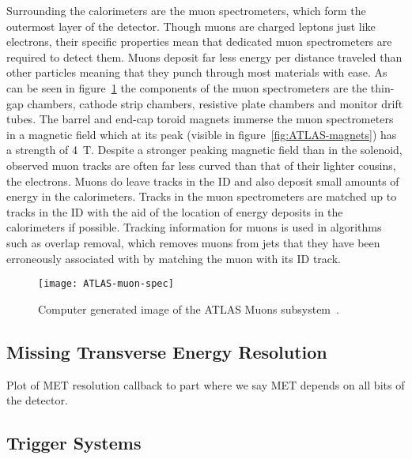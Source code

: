 Surrounding the calorimeters are the muon spectrometers, which form the
outermost layer of the detector. Though muons are charged leptons just like
electrons, their specific properties mean that dedicated muon spectrometers are
required to detect them. Muons deposit far less energy per distance traveled
than other particles meaning that they punch through most materials with ease.
As can be seen in figure~\ref{fig:ATLAS-muon} the components of the muon
spectrometers are the thin-gap chambers, cathode strip chambers, resistive plate
chambers and monitor drift tubes. The barrel and end-cap toroid magnets immerse
the muon spectrometers in a magnetic field which at its peak (visible in
figure~\ref{fig:ATLAS-magnets}) has a strength of 4~T. Despite a stronger
peaking magnetic field than in the solenoid, observed muon tracks are often far
less curved than that of their lighter cousins, the electrons. Muons do leave
tracks in the ID and also deposit small amounts of energy in the calorimeters.
Tracks in the muon spectrometers are matched up to tracks in the ID with the aid
of the location of energy deposits in the calorimeters if possible. Tracking
information for muons is used in algorithms such as overlap removal, which
removes muons from jets that they have been erroneously associated with by
matching the muon with its ID track.
\begin{figure}[ht]
  \centering
  \texttt{[image: ATLAS-muon-spec]}
  \caption[ATLAS muon subsystem]{Computer generated image of the ATLAS Muons
    subsystem~\cite{ATLAS-muon-fig}.}%
  \label{fig:ATLAS-muon}
\end{figure}

\subsection{Missing Transverse Energy Resolution}
Plot of MET resolution callback to part where we say MET depends on all bits of the detector.

\subsection{Trigger Systems}%
\label{sec:trigger}

